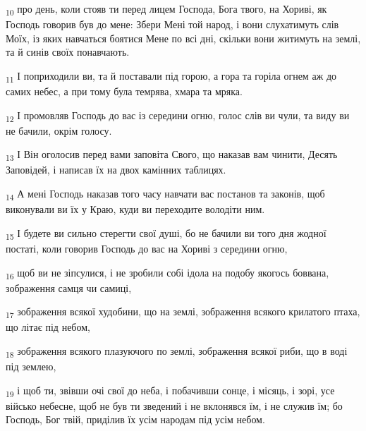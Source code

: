 \begin{tcolorbox}
\textsubscript{10} про день, коли стояв ти перед лицем Господа, Бога твого, на Хориві, як Господь говорив був до мене: Збери Мені той народ, і вони слухатимуть слів Моїх, із яких навчаться боятися Мене по всі дні, скільки вони житимуть на землі, та й синів своїх понавчають.
\end{tcolorbox}
\begin{tcolorbox}
\textsubscript{11} І поприходили ви, та й поставали під горою, а гора та горіла огнем аж до самих небес, а при тому була темрява, хмара та мряка.
\end{tcolorbox}
\begin{tcolorbox}
\textsubscript{12} І промовляв Господь до вас із середини огню, голос слів ви чули, та виду ви не бачили, окрім голосу.
\end{tcolorbox}
\begin{tcolorbox}
\textsubscript{13} І Він оголосив перед вами заповіта Свого, що наказав вам чинити, Десять Заповідей, і написав їх на двох камінних таблицях.
\end{tcolorbox}
\begin{tcolorbox}
\textsubscript{14} А мені Господь наказав того часу навчати вас постанов та законів, щоб виконували ви їх у Краю, куди ви переходите володіти ним.
\end{tcolorbox}
\begin{tcolorbox}
\textsubscript{15} І будете ви сильно стерегти свої душі, бо не бачили ви того дня жодної постаті, коли говорив Господь до вас на Хориві з середини огню,
\end{tcolorbox}
\begin{tcolorbox}
\textsubscript{16} щоб ви не зіпсулися, і не зробили собі ідола на подобу якогось боввана, зображення самця чи самиці,
\end{tcolorbox}
\begin{tcolorbox}
\textsubscript{17} зображення всякої худобини, що на землі, зображення всякого крилатого птаха, що літає під небом,
\end{tcolorbox}
\begin{tcolorbox}
\textsubscript{18} зображення всякого плазуючого по землі, зображення всякої риби, що в воді під землею,
\end{tcolorbox}
\begin{tcolorbox}
\textsubscript{19} і щоб ти, звівши очі свої до неба, і побачивши сонце, і місяць, і зорі, усе військо небесне, щоб не був ти зведений і не вклонявся їм, і не служив їм; бо Господь, Бог твій, приділив їх усім народам під усім небом.
\end{tcolorbox}
